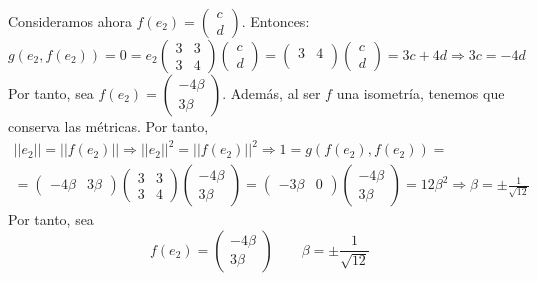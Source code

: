 \begin{ejercicio}
    Consideramos ahora $f(e_2)=\left(\begin{array}{c}
            c \\ d
        \end{array}\right)$. Entonces:
    \begin{equation*}
        g(e_2, f(e_2)) = 0 = e_2 \left(\begin{array}{cc}
            3 & 3 \\
            3 & 4
        \end{array}\right) \left(\begin{array}{c}
            c \\ d
        \end{array}\right) = \left(\begin{array}{cc}
            3 & 4 \\
        \end{array}\right) \left(\begin{array}{c}
            c \\ d
        \end{array}\right)
        = 3c + 4d \Longrightarrow 3c=-4d
    \end{equation*}
    Por tanto, sea $f(e_2)=\left(\begin{array}{c}
            -4\beta \\ 3\beta
        \end{array}\right)$. Además, al ser $f$ una isometría, tenemos que conserva las métricas. Por tanto,
    \begin{multline*}
        ||e_2|| = ||f(e_2)|| \Longrightarrow ||e_2||^2 = ||f(e_2)||^2 \Longrightarrow
        1 = g(f(e_2), f(e_2)) = \\
        = \left(\begin{array}{cc}
            -4\beta & 3\beta
        \end{array}\right)
        \left(\begin{array}{cc}
            3 & 3 \\
            3 & 4
        \end{array}\right) \left(\begin{array}{c}
            -4\beta \\ 3\beta
        \end{array}\right)
        = \left(\begin{array}{cc}
            -3\beta & 0
        \end{array}\right)
        \left(\begin{array}{c}
            -4\beta \\ 3\beta
        \end{array}\right) = 12\beta^2 \Longrightarrow \beta = \pm \frac{1}{\sqrt{12}}
    \end{multline*}
    Por tanto, sea $$f(e_2)=\left(\begin{array}{c}
            -4\beta \\ 3\beta
        \end{array}\right) \qquad \beta = \pm \frac{1}{\sqrt{12}}$$



\end{ejercicio}
